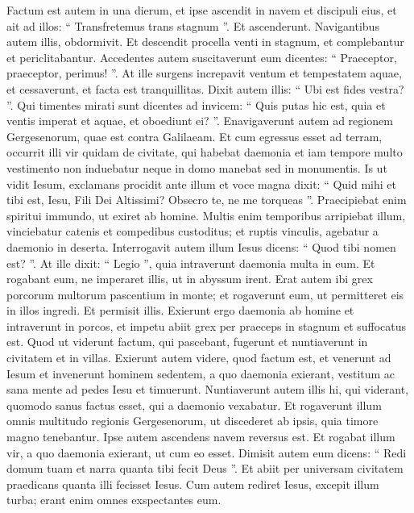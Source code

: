 \begin{biblechapter}
\begin{biblechapter}
\begin{biblechapter}
\begin{biblechapter}
\begin{biblechapter}
\begin{biblechapter}
\begin{biblechapter}
\begin{biblechapter}
 \verse Factum est autem in una dierum, et ipse ascendit in navem et discipuli eius, et ait ad illos: “ Transfretemus trans stagnum ”. Et ascenderunt. 
\verse Navigantibus autem illis, obdormivit. Et descendit procella venti in stagnum, et complebantur et periclitabantur. 
\verse Accedentes autem suscitaverunt eum dicentes: “ Praeceptor, praeceptor, perimus! ”. At ille surgens increpavit ventum et tempestatem aquae, et cessaverunt, et facta est tranquillitas. 
\verse Dixit autem illis: “ Ubi est fides vestra? ”. Qui timentes mirati sunt dicentes ad invicem: “ Quis putas hic est, quia et ventis imperat et aquae, et oboediunt ei? ”.
 \verse Enavigaverunt autem ad regionem Gergesenorum, quae est contra Galilaeam. 
 \verse Et cum egressus esset ad terram, occurrit illi vir quidam de civitate, qui habebat daemonia et iam tempore multo vestimento non induebatur neque in domo manebat sed in monumentis. 
\verse Is ut vidit Iesum, exclamans procidit ante illum et voce magna dixit: “ Quid mihi et tibi est, Iesu, Fili Dei Altissimi? Obsecro te, ne me torqueas ”. 
\verse Praecipiebat enim spiritui immundo, ut exiret ab homine. Multis enim temporibus arripiebat illum, vinciebatur catenis et compedibus custoditus; et ruptis vinculis, agebatur a daemonio in deserta. 
 \verse Interrogavit autem illum Iesus dicens: “ Quod tibi nomen est? ”. At ille dixit: “ Legio ”, quia intraverunt daemonia multa in eum. 
\verse Et rogabant eum, ne imperaret illis, ut in abyssum irent.
 \verse Erat autem ibi grex porcorum multorum pascentium in monte; et rogaverunt eum, ut permitteret eis in illos ingredi. Et permisit illis. 
\verse Exierunt ergo daemonia ab homine et intraverunt in porcos, et impetu abiit grex per praeceps in stagnum et suffocatus est. 
\verse Quod ut viderunt factum, qui pascebant, fugerunt et nuntiaverunt in civitatem et in villas. 
\verse Exierunt autem videre, quod factum est, et venerunt ad Iesum et invenerunt hominem sedentem, a quo daemonia exierant, vestitum ac sana mente ad pedes Iesu et timuerunt. 
\verse Nuntiaverunt autem illis hi, qui viderant, quomodo sanus factus esset, qui a daemonio vexabatur. 
\verse Et rogaverunt illum omnis multitudo regionis Gergesenorum, ut discederet ab ipsis, quia timore magno tenebantur. Ipse autem ascendens navem reversus est. 
\verse Et rogabat illum vir, a quo daemonia exierant, ut cum eo esset. Dimisit autem eum dicens: 
\verse “ Redi domum tuam et narra quanta tibi fecit Deus ”. Et abiit per universam civitatem praedicans quanta illi fecisset Iesus.
 \verse Cum autem rediret Iesus, excepit illum turba; erant enim omnes exspectantes eum. 

\end{biblechapter}
\end{biblechapter}
\end{biblechapter}
\end{biblechapter}
\end{biblechapter}
\end{biblechapter}
\end{biblechapter}
\end{biblechapter}
